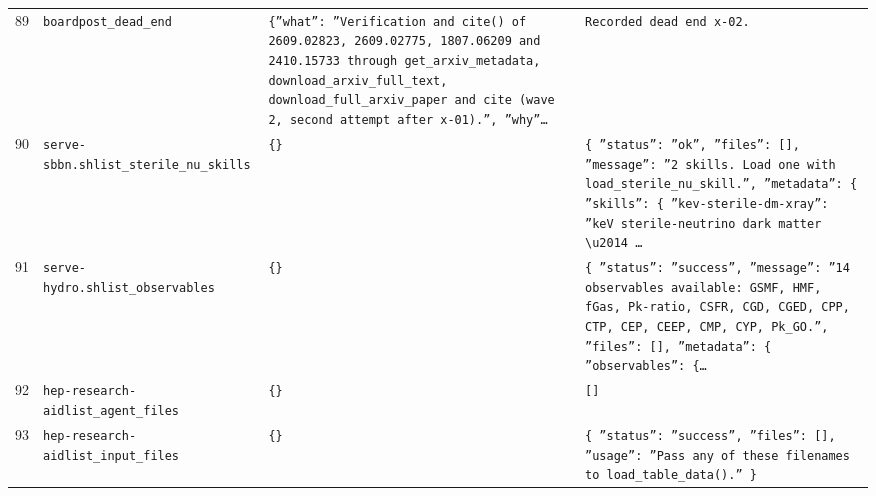 \documentclass[11pt,a4paper]{article}
\begin{document}
\begin{longtable}{@{}p{}p{}p{}p{}@{}}
89 & \texttt{board}\newline\texttt{post\_\allowbreak{}dead\_\allowbreak{}end} & \texttt{\{''what'':\allowbreak{} ''Verification and cite()\allowbreak{} of 2609.02823,\allowbreak{} 2609.02775,\allowbreak{} 1807.06209 and 2410.15733 through get\_\allowbreak{}arxiv\_\allowbreak{}metadata,\allowbreak{} download\_\allowbreak{}arxiv\_\allowbreak{}full\_\allowbreak{}text,\allowbreak{} download\_\allowbreak{}full\_\allowbreak{}arxiv\_\allowbreak{}paper and cite (wave 2,\allowbreak{} second attempt after x-01)\allowbreak{}.'',\allowbreak{} ''why''\ldots{}\allowbreak{}} & \texttt{Recorded dead end x-02.} \\
90 & \texttt{serve-sbbn.sh}\newline\texttt{list\_\allowbreak{}sterile\_\allowbreak{}nu\_\allowbreak{}skills} & \texttt{\{\}\allowbreak{}} & \texttt{\{   ''status'':\allowbreak{} ''ok'',\allowbreak{}   ''files'':\allowbreak{} []\allowbreak{},\allowbreak{}   ''message'':\allowbreak{} ''2 skills. Load one with load\_\allowbreak{}sterile\_\allowbreak{}nu\_\allowbreak{}skill.'',\allowbreak{}   ''metadata'':\allowbreak{} \{     ''skills'':\allowbreak{} \{       ''kev-sterile-dm-xray'':\allowbreak{} ''keV sterile-neutrino dark matter \textbackslash{}\allowbreak{}u2014 \ldots{}\allowbreak{}} \\
91 & \texttt{serve-hydro.sh}\newline\texttt{list\_\allowbreak{}observables} & \texttt{\{\}\allowbreak{}} & \texttt{\{   ''status'':\allowbreak{} ''success'',\allowbreak{}   ''message'':\allowbreak{} ''14 observables available:\allowbreak{} GSMF,\allowbreak{} HMF,\allowbreak{} fGas,\allowbreak{} Pk-ratio,\allowbreak{} CSFR,\allowbreak{} CGD,\allowbreak{} CGED,\allowbreak{} CPP,\allowbreak{} CTP,\allowbreak{} CEP,\allowbreak{} CEEP,\allowbreak{} CMP,\allowbreak{} CYP,\allowbreak{} Pk\_\allowbreak{}GO.'',\allowbreak{}   ''files'':\allowbreak{} []\allowbreak{},\allowbreak{}   ''metadata'':\allowbreak{} \{     ''observables'':\allowbreak{} \{\ldots{}\allowbreak{}} \\
92 & \texttt{hep-research-aid}\newline\texttt{list\_\allowbreak{}agent\_\allowbreak{}files} & \texttt{\{\}\allowbreak{}} & \texttt{[]\allowbreak{}} \\
93 & \texttt{hep-research-aid}\newline\texttt{list\_\allowbreak{}input\_\allowbreak{}files} & \texttt{\{\}\allowbreak{}} & \texttt{\{   ''status'':\allowbreak{} ''success'',\allowbreak{}   ''files'':\allowbreak{} []\allowbreak{},\allowbreak{}   ''usage'':\allowbreak{} ''Pass any of these filenames to load\_\allowbreak{}table\_\allowbreak{}data()\allowbreak{}.'' \}\allowbreak{}} \\

\end{longtable}
\end{document}
